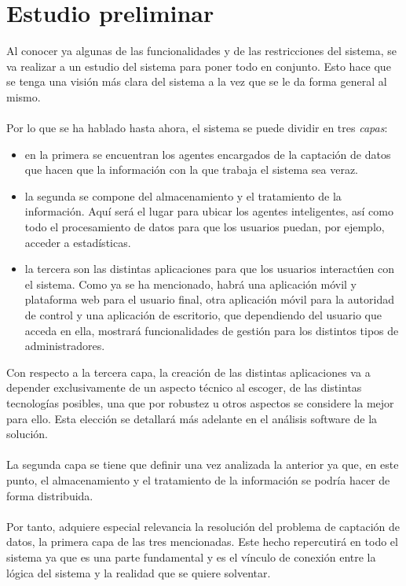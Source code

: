 \section{Estudio preliminar}
Al conocer ya algunas de las funcionalidades y de las restricciones del sistema, se va realizar a un estudio del sistema para poner todo en conjunto. Esto hace que se tenga una visión más clara del sistema a la vez que se le da forma general al mismo. 
\\\\
Por lo que se ha hablado hasta ahora, el sistema se puede dividir en tres \textit{capas}:
\begin{itemize}
	\item en la primera se encuentran los agentes encargados de la captación de datos que hacen que la información con la que trabaja el sistema sea veraz.
	\item la segunda se compone del almacenamiento y el tratamiento de la información. Aquí será el lugar para ubicar los agentes inteligentes, así como todo el procesamiento de datos para que los usuarios puedan, por ejemplo, acceder a estadísticas.
	\item la tercera son las distintas aplicaciones para que los usuarios interactúen con el sistema. Como ya se ha mencionado, habrá una aplicación móvil y plataforma web para el usuario final, otra aplicación móvil para la autoridad de control y una aplicación de escritorio, que dependiendo del usuario que acceda en ella, mostrará funcionalidades de gestión para los distintos tipos de administradores.
\end{itemize}
Con respecto a la tercera capa, la creación de las distintas aplicaciones va a depender exclusivamente de un aspecto técnico al escoger, de las distintas tecnologías posibles, una que por robustez u otros aspectos se considere la mejor para ello. Esta elección se detallará más adelante en el análisis software de la solución.
\\\\
La segunda capa se tiene que definir una vez analizada la anterior ya que, en este punto, el almacenamiento y el tratamiento de la información se podría hacer de forma distribuida.
\\\\
Por tanto, adquiere especial relevancia la resolución del problema de captación de datos, la primera capa de las tres mencionadas. Este hecho repercutirá en todo el sistema ya que es una parte fundamental y es el vínculo de conexión entre la lógica del sistema y la realidad que se quiere solventar.
\newpage
